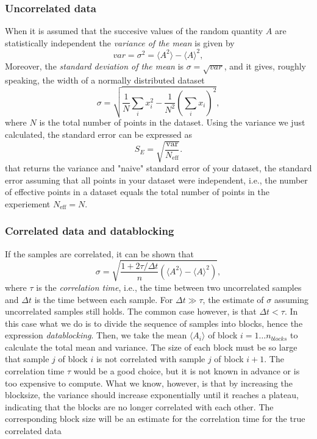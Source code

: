 \subsubsection{Uncorrelated data}
When it is assumed that the succesive values of the random quantity $A$ are statistically independent the \emph{variance of the mean} is given by
\begin{equation}\label{variance}
 var = \sigma^2 = \langle A^2\rangle - \langle A\rangle^2,
\end{equation}
Moreover, the \emph{standard deviation of the mean} is $\sigma = \sqrt{var}$, and it gives, roughly speaking, the width of a normally distributed dataset 
\begin{equation*}
\sigma=\sqrt { \frac{1}{N} \sum_i x_i^2 - \frac{1}{N^2}(\sum_i x_i)^2 },
\end{equation*}
where $N$ is the total number of points in the dataset. Using the variance we just calculated, the standard error can be expressed as 
\begin{equation*}
S_E = \sqrt{\frac{\text{var}}{N_\text{eff}}}.
\end{equation*}
that returns the variance and "naive" standard error of your dataset, the standard error assuming that all points in your dataset were independent, i.e., the number of effective points in a dataset equals the total number of points in the experiement $N_\text{eff}=N$.

\subsubsection{Correlated data and datablocking}
If the samples are correlated, it can be shown\cite{Hammond,jensen} that
\begin{equation*}
  \sigma=\sqrt{\frac{1+2\tau/\Delta
      t}{n}\left(\langle {A}^2\rangle-\langle {A}\rangle^2\right)},
\end{equation*}
where $\tau$ is the \emph{correlation time}, i.e., the time between two uncorrelated samples and $\Delta t$ is the time between each sample. For $\Delta t\gg\tau$, the estimate of $\sigma$ assuming uncorrelated samples still holds. The common case however, is that $\Delta t<\tau$. In this case what we do is to divide the sequence of samples into blocks, hence the expression \emph{datablocking}. Then, we take the mean $\langle {A}_i\rangle$ of block $i=1\ldots n_{blocks}$ to calculate the total mean and variance. The size of each block must be so large that sample $j$ of block $i$ is not correlated with sample $j$ of block $i+1$. The correlation time $\tau$ would be a good choice, but it is not known in advance or is too expensive to compute. What we know, however, is that by increasing the blocksize, the variance should increase exponentially until it reaches a plateau, indicating that the blocks are no longer correlated with each other. The corresponding block size will be an estimate for the correlation time for the true correlated data

